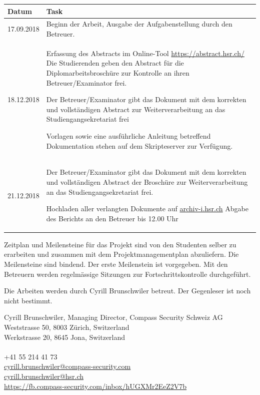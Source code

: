 \begin{table}[H]
    \centering
    \begin{tabular}{| p{2.5cm} | p{13.5cm} |}\hline
        \textbf{Datum} & \textbf{Task}  \\ \hline
        17.09.2018 & Beginn der Arbeit, Ausgabe der Aufgabenstellung durch den Betreuer. \\ \hline  
        18.12.2018 & Erfassung des Abstracts im Online-Tool \url{https://abstract.hsr.ch/} Die Studierenden geben den Abstract für die Diplomarbeitsbroschüre zur Kontrolle an ihren Betreuer/Examinator frei.  
        \par\vspace{4mm}
        Der Betreuer/Examinator gibt das Dokument mit dem korrekten und vollständigen Abstract zur Weiterverarbeitung an das Studiengangsekretariat frei 
        \par\vspace{4mm}
        Vorlagen sowie eine ausführliche Anleitung betreffend Dokumentation stehen auf dem Skripteserver zur Verfügung.\\ \hline  
        21.12.2018 & Der Betreuer/Examinator gibt das Dokument mit dem korrekten und vollständigen Abstract der Broschüre zur Weiterverarbeitung an das Studiengangsekretariat frei.
        \par\vspace{4mm}
        Hochladen aller verlangten Dokumente auf \url{archiv-i.hsr.ch} Abgabe des Berichts an den Betreuer bis 12.00 Uhr \\ \hline      
    \end{tabular}
\end{table}

Zeitplan und Meilensteine für das Projekt sind von den Studenten selber zu erarbeiten und zusammen mit dem Projektmanagementplan abzuliefern. Die Meilensteine sind bindend. Der erste Meilenstein ist vorgegeben. Mit den Betreuern werden regelmässige Sitzungen zur Fortschrittskontrolle durchgeführt.

Die Arbeiten werden durch Cyrill Brunschwiler betreut. Der Gegenleser ist noch nicht bestimmt.

Cyrill Brunschwiler, Managing Director, Compass Security Schweiz AG\\
Weststrasse 50, 8003 Zürich, Switzerland\\
Werkstrasse 20, 8645 Jona, Switzerland
\\\\
+41 55 214 41 73 \ \\
\href{mailto:cyrill.brunschwiler@compass-security.com}{cyrill.brunschwiler@compass-security.com}\ \\
\href{mailto:cyrill.brunschwiler@hsr.ch }{cyrill.brunschwiler@hsr.ch} \ \\
\url{https://fb.compass-security.com/inbox/hUGXMr2EeZ2V7b}

